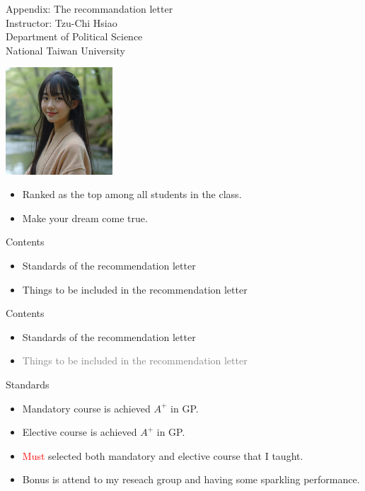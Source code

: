 \documentclass{beamer}
\title{}
\author{}
\date{}
\begin{document}
\begin{frame}
\begin{center}
\Large{Appendix: The recommandation letter} \\
\vspace{3em}
\normalsize{Instructor: Tzu-Chi Hsiao} \\
\vspace{3em}
\small{Department of Political Science} \\
\vspace{1em}
\small{National Taiwan University} \\
\end{center}
\end{frame}
\begin{frame}{}
\begin{center}
\includegraphics[width=0.3\textwidth]{letter.png} \\
\end{center}
\begin{itemize}
\item Ranked as the top among all students in the class.
\item Make your dream come true.
\end{itemize}
\end{frame}
\begin{frame}{Contents}
\begin{itemize}
\item Standards of the recommendation letter
\item Things to be included in the recommendation letter
\end{itemize}
\end{frame}
\begin{frame}{Contents}
\begin{itemize}
\item Standards of the recommendation letter
\item \textcolor{gray}{Things to be included in the recommendation letter}
\end{itemize}
\end{frame}
\begin{frame}{Standards}
\begin{itemize}
\item Mandatory course is achieved $A^+$ in GP.
\item Elective course is achieved $A^+$ in GP.
\item \textcolor{red}{Must} selected both mandatory and elective course that I taught.
\item Bonus is attend to my reseach group and having some sparkling performance.
\end{itemize}
\end{frame}
\end{document}
